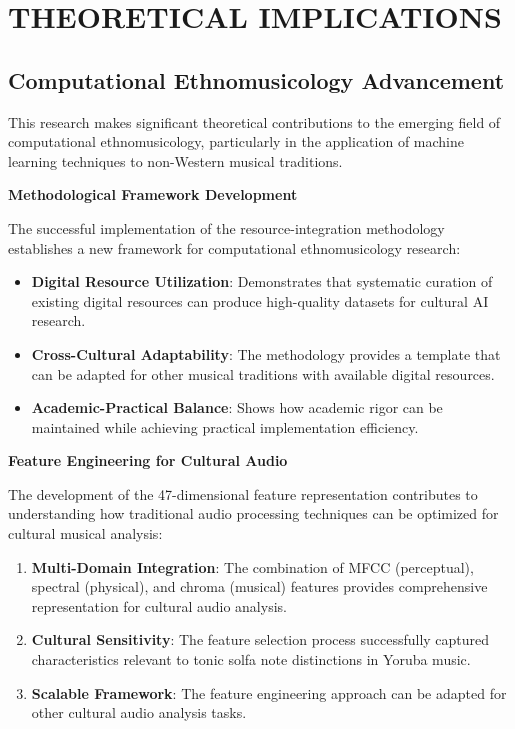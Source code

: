 \documentclass[12pt,a4paper]{article}
\begin{document}
\section{THEORETICAL IMPLICATIONS}

\subsection{Computational Ethnomusicology Advancement}

This research makes significant theoretical contributions to the emerging field of computational ethnomusicology, particularly in the application of machine learning techniques to non-Western musical traditions.

\textbf{Methodological Framework Development}

The successful implementation of the resource-integration methodology establishes a new framework for computational ethnomusicology research:

\begin{itemize}
\item \textbf{Digital Resource Utilization}: Demonstrates that systematic curation of existing digital resources can produce high-quality datasets for cultural AI research.
\item \textbf{Cross-Cultural Adaptability}: The methodology provides a template that can be adapted for other musical traditions with available digital resources.
\item \textbf{Academic-Practical Balance}: Shows how academic rigor can be maintained while achieving practical implementation efficiency.
\end{itemize}

\textbf{Feature Engineering for Cultural Audio}

The development of the 47-dimensional feature representation contributes to understanding how traditional audio processing techniques can be optimized for cultural musical analysis:

\begin{enumerate}
\item \textbf{Multi-Domain Integration}: The combination of MFCC (perceptual), spectral (physical), and chroma (musical) features provides comprehensive representation for cultural audio analysis.
\item \textbf{Cultural Sensitivity}: The feature selection process successfully captured characteristics relevant to tonic solfa note distinctions in Yoruba music.
\item \textbf{Scalable Framework}: The feature engineering approach can be adapted for other cultural audio analysis tasks.
\end{enumerate}
\end{document}
